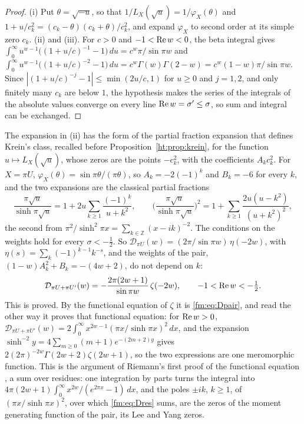 \begin{proof}
(i) Put $\theta=\sqrt{-u}$, so that $1/L_X(\sqrt u)=1/\varphi_X(\theta)$ and $1+u/c_k^2=(c_k-\theta)(c_k+\theta)/c_k^2$, and expand $\varphi_X$ to second order at its simple zero $c_k$. (ii) and (iii). For $c>0$ and $-1<\operatorname{Re} w<0$, the beta integral gives $\int_0^\infty u^{w-1}\big((1+u/c)^{-1}-1\big)\,du=c^w\pi/\sin\pi w$ and $\int_0^\infty u^{w-1}\big((1+u/c)^{-2}-1\big)\,du=c^w\Gamma(w)\Gamma(2-w)=c^w(1-w)\pi/\sin\pi w$. Since $|(1+u/c)^{-j}-1|\le\min(2u/c,1)$ for $u\ge0$ and $j=1,2$, and only finitely many $c_k$ are below $1$, the hypothesis makes the series of the integrals of the absolute values converge on every line $\operatorname{Re} w=\sigma'\le\sigma$, so sum and integral can be exchanged.
\end{proof}

The expansion in (ii) has the form of the partial fraction expansion that defines Krein's class, recalled before Proposition~\ref{ht:prop:krein}, for the function $u\mapsto L_X(\sqrt u)$, whose zeros are the points $-c_k^2$, with the coefficients $A_kc_k^2$. For $X=\pi U$, $\varphi_X(\theta)=\sin\pi\theta/(\pi\theta)$, so $A_k=-2(-1)^k$ and $B_k=-6$ for every $k$, and the two expansions are the classical partial fractions
\[
\frac{\pi\sqrt u}{\sinh\pi\sqrt u}=1+2u\sum_{k\ge1}\frac{(-1)^k}{u+k^2},\qquad\Big(\frac{\pi\sqrt u}{\sinh\pi\sqrt u}\Big)^2=1+\sum_{k\ge1}\frac{2u(u-k^2)}{(u+k^2)^2},
\]
the second from $\pi^2/\sinh^2\pi x=\sum_{k\in\mathbb Z}(x-ik)^{-2}$. The conditions on the weights hold for every $\sigma<-\frac12$. So $\mathcal D_{\pi U}(w)=(2\pi/\sin\pi w)\,\eta(-2w)$, with $\eta(s)=\sum_k(-1)^{k-1}k^{-s}$, and the weights of the pair, $(1-w)A_k^2+B_k=-(4w+2)$, do not depend on $k$:
\begin{equation}\label{fm:eq:Dres}
\mathcal D_{\pi U+\pi U'}(w)=-\frac{2\pi(2w+1)}{\sin\pi w}\,\zeta(-2w),\qquad -1<\operatorname{Re} w<-\tfrac12 .
\end{equation}
This is proved. By the functional equation of $\zeta$ it is \eqref{fm:eq:Dpair}, and read the other way it proves that functional equation: for $\operatorname{Re} w>0$, $\mathcal D_{\pi U+\pi U'}(w)=2\int_0^\infty x^{2w-1}(\pi x/\sinh\pi x)^2\,dx$, and the expansion $\sinh^{-2}y=4\sum_{m\ge0}(m+1)e^{-(2m+2)y}$ gives $2(2\pi)^{-2w}\Gamma(2w+2)\zeta(2w+1)$, so the two expressions are one meromorphic function. This is the argument of Riemann's first proof of the functional equation \cite[Chapter~1]{Edwards}, a sum over residues: one integration by parts turns the integral into $4\pi(2w+1)\int_0^\infty x^{2w}/(e^{2\pi x}-1)\,dx$, and the poles $\pm ik$, $k\ge1$, of $(\pi x/\sinh\pi x)^2$, over which \eqref{fm:eq:Dres} sums, are the zeros of the moment generating function of the pair, its Lee and Yang zeros.

